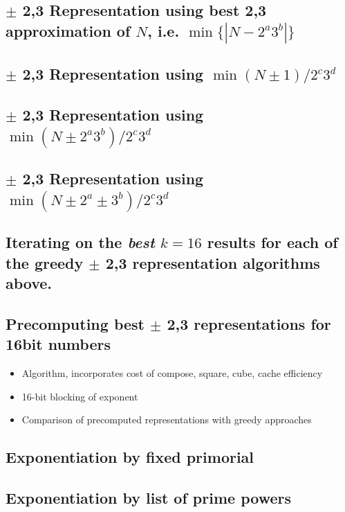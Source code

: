 \documentclass{ucalgthes1}
\theoremstyle{definition}
\begin{document}
\subsection{$\pm$ 2,3 Representation using best 2,3 approximation of $N$, i.e. $\min\{|N-2^a3^b|\}$}

\subsection{$\pm$ 2,3 Representation using $\min (N \pm 1) / 2^c3^d$}

\subsection{$\pm$ 2,3 Representation using $\min (N \pm 2^a3^b) / 2^c 3^d$}

\subsection{$\pm$ 2,3 Representation using $\min (N \pm 2^a \pm 3^b)/2^c3^d$}

\subsection{Iterating on the \emph{best} $k=16$ results for each of the greedy $\pm$ 2,3 representation algorithms above.}

\subsection{Precomputing best $\pm$ 2,3 representations for 16bit numbers}
\begin{itemize}
\item Algorithm, incorporates cost of compose, square, cube, cache efficiency
\item 16-bit blocking of exponent
\item Comparison of precomputed representations with greedy approaches
\end{itemize}

\subsection{Exponentiation by fixed primorial}

\subsection{Exponentiation by list of prime powers}
\end{document}

